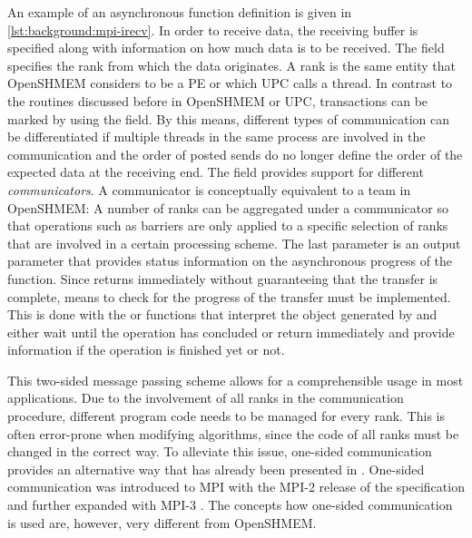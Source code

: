 An example of an asynchronous function definition is given in \autoref{lst:background:mpi-irecv}. In order to receive data, the receiving buffer is specified along with information on how much data is to be received. The  field specifies the rank from which the data originates. A rank is the same entity that \ac{OpenSHMEM} considers to be a \ac{PE} or which \ac{UPC} calls a thread. In contrast to the routines discussed before in \ac{OpenSHMEM} or \ac{UPC}, transactions can be marked by using the  field. By this means, different types of communication can be differentiated if \eg multiple threads in the same process are involved in the communication and the order of posted sends do no longer define the order of the expected data at the receiving end. The  field provides support for different \emph{communicators}. A communicator is conceptually equivalent to a team in \ac{OpenSHMEM}: A number of ranks can be aggregated under a communicator so that operations such as barriers are only applied to a specific selection of ranks that are involved in a certain processing scheme. The last parameter  is an output parameter that provides status information on the asynchronous progress of the function. Since  returns immediately without guaranteeing that the transfer is complete, means to check for the progress of the transfer must be implemented. This is done with the  or  functions that interpret the  object generated by  and either wait until the operation has concluded or return immediately and provide information if the operation is finished yet or not.

This two-sided message passing scheme allows for a comprehensible usage in most applications. Due to the involvement of all ranks in the communication procedure, different program code needs to be managed for every rank. This is often error-prone when modifying algorithms, since the code of all ranks must be changed in the correct way. To alleviate this issue, one-sided communication provides an alternative way that has already been presented in . One-sided communication was introduced to \ac{MPI} with the \ac{MPI}-2 release of the specification and further expanded with \ac{MPI}-3 \cite[p.~iii]{mpi3-std}. The concepts how one-sided communication is used are, however, very different from \ac{OpenSHMEM}.

